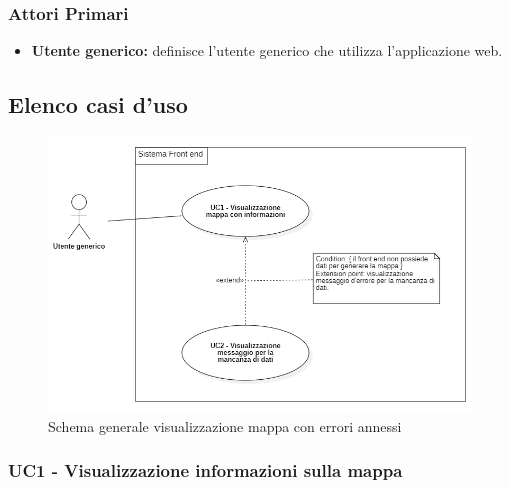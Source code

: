\subsubsection{Attori Primari}\label{CasiDUsoCasiDUsoTraUnUtenteEIlFrontEndAttoriDeiCasiDUsoAttoriPrimari}
\begin{itemize}
	\item \textbf{Utente generico:} definisce l'utente generico che utilizza l'applicazione web.
\end{itemize}

\subsection{Elenco casi d'uso}\label{CasiDUsoCasiDUsoTraUnUtenteEIlFrontEndElencoCasiDUso}

\begin{center}
	\begin{figure}[H]
		\centering\includegraphics[scale=0.8]{../immagini/attori_casi/UC_1_2.png}
		\caption{Schema generale visualizzazione mappa con errori annessi}
	\end{figure}
\end{center}

\subsubsection{UC1 - Visualizzazione informazioni sulla mappa}\label{CasiDUsoCasiDUsoTraUnUtenteEIlFrontEndElencoCasiDUsoUC1VisualizzazioneInformazioniSullaMappa} %


